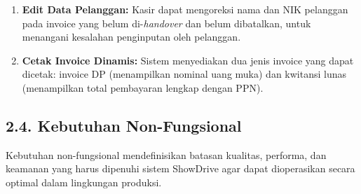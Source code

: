 \documentclass[11pt, a5paper]{article}
\begin{document}
\begin{enumerate}[label=\arabic*.]
  \item \textbf{Edit Data Pelanggan:} Kasir dapat mengoreksi nama dan NIK
        pelanggan pada invoice yang belum di-\textit{handover} dan belum
        dibatalkan, untuk menangani kesalahan penginputan oleh pelanggan.

  \item \textbf{Cetak Invoice Dinamis:} Sistem menyediakan dua jenis invoice
        yang dapat dicetak: invoice DP (menampilkan nominal uang muka) dan
        kwitansi lunas (menampilkan total pembayaran lengkap dengan PPN).
\end{enumerate}

\subsection*{2.4. Kebutuhan Non-Fungsional}

Kebutuhan non-fungsional mendefinisikan batasan kualitas, performa, dan keamanan
yang harus dipenuhi sistem ShowDrive agar dapat dioperasikan secara optimal dalam
lingkungan produksi.
\end{document}
